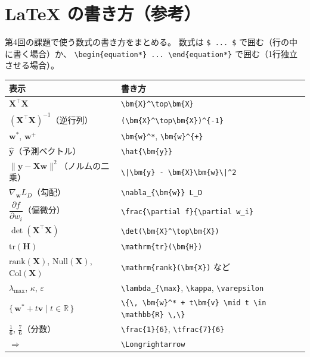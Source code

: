 \documentclass[a4paper,dvipdfmx]{jsarticle}
\newcommand{\提出期限}{2026年10月19日（月）}
\newcommand{\学籍番号}{0000000}
\newcommand{\氏名}{氏名を書く}
\newcommand{\提出日}{2026年10月19日}
\begin{document}
\pagebreak

\section*{LaTeX の書き方（参考）}

第4回の課題で使う数式の書き方をまとめる。
数式は \verb|$ ... $| で囲む（行の中に書く場合）か、
\verb|\begin{equation*} ... \end{equation*}| で囲む（1行独立させる場合）。

\begin{center}
\small
\begin{tabular}{l|l}
\hline
表示 & 書き方 \\
\hline\hline
$\bm{X}^\top\bm{X}$ & \verb|\bm{X}^\top\bm{X}| \\
$(\bm{X}^\top\bm{X})^{-1}$（逆行列） & \verb|(\bm{X}^\top\bm{X})^{-1}| \\
$\bm{w}^*$, $\bm{w}^{+}$ & \verb|\bm{w}^*|, \verb|\bm{w}^{+}| \\
$\hat{\bm{y}}$（予測ベクトル） & \verb|\hat{\bm{y}}| \\
$\|\bm{y} - \bm{X}\bm{w}\|^2$（ノルムの二乗） & \verb+\|\bm{y} - \bm{X}\bm{w}\|^2+ \\
$\nabla_{\bm{w}} L_D$（勾配） & \verb|\nabla_{\bm{w}} L_D| \\
$\dfrac{\partial f}{\partial w_i}$（偏微分） & \verb|\frac{\partial f}{\partial w_i}| \\
$\det(\bm{X}^\top\bm{X})$ & \verb|\det(\bm{X}^\top\bm{X})| \\
$\mathrm{tr}(\bm{H})$ & \verb|\mathrm{tr}(\bm{H})| \\
$\mathrm{rank}(\bm{X})$, $\mathrm{Null}(\bm{X})$, $\mathrm{Col}(\bm{X})$ & \verb|\mathrm{rank}(\bm{X})| など \\
$\lambda_{\max}$, $\kappa$, $\varepsilon$ & \verb|\lambda_{\max}|, \verb|\kappa|, \verb|\varepsilon| \\
$\{\, \bm{w}^* + t\bm{v} \mid t \in \mathbb{R} \,\}$ & \verb|\{\, \bm{w}^* + t\bm{v} \mid t \in \mathbb{R} \,\}| \\
$\frac{1}{6}$, $\tfrac{7}{6}$（分数） & \verb|\frac{1}{6}|, \verb|\tfrac{7}{6}| \\
$\Longrightarrow$ & \verb|\Longrightarrow| \\
\hline
\end{tabular}
\end{center}
\end{document}

